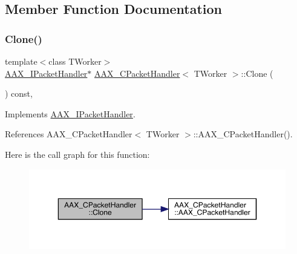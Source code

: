 \subsection{Member Function Documentation}
\mbox{\label{a01525_ac297f4d9c97ff438566b83a097866f46}} 
\subsubsection{\texorpdfstring{Clone()}{Clone()}}
{\footnotesize\ttfamily template$<$class T\+Worker$>$ \\
\mbox{\hyperlink{a01521}{A\+A\+X\+\_\+\+I\+Packet\+Handler}}$\ast$ \mbox{\hyperlink{a01525}{A\+A\+X\+\_\+\+C\+Packet\+Handler}}$<$ T\+Worker $>$\+::Clone (\begin{DoxyParamCaption}{ }\end{DoxyParamCaption}) const\hspace{0.3cm}{\ttfamily [inline]}, {\ttfamily [virtual]}}



Implements \mbox{\hyperlink{a01521_a1d6270e9a6fb871ca6b83b1275533377}{A\+A\+X\+\_\+\+I\+Packet\+Handler}}.



References A\+A\+X\+\_\+\+C\+Packet\+Handler$<$ T\+Worker $>$\+::\+A\+A\+X\+\_\+\+C\+Packet\+Handler().

Here is the call graph for this function\+:
\nopagebreak
\begin{figure}[H]
\begin{center}
\leavevmode
\includegraphics[width=350pt]{a01525_ac297f4d9c97ff438566b83a097866f46_cgraph}
\end{center}
\end{figure}
\mbox{\label{a01525_a29228bebdc801e6cbf0b67873c6d69ca}} 

